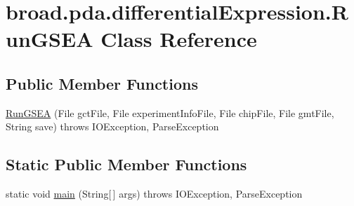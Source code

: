 \hypertarget{classbroad_1_1pda_1_1differential_expression_1_1_run_g_s_e_a}{\section{broad.\+pda.\+differential\+Expression.\+Run\+G\+S\+E\+A Class Reference}
\label{classbroad_1_1pda_1_1differential_expression_1_1_run_g_s_e_a}
}
\subsection*{Public Member Functions}
\begin{DoxyCompactItemize}
\item 
\hyperlink{classbroad_1_1pda_1_1differential_expression_1_1_run_g_s_e_a_a7a8ba3d2746bdbabcc8539b018f317b3}{Run\+G\+S\+E\+A} (File gct\+File, File experiment\+Info\+File, File chip\+File, File gmt\+File, String save)  throws I\+O\+Exception, Parse\+Exception
\end{DoxyCompactItemize}
\subsection*{Static Public Member Functions}
\begin{DoxyCompactItemize}
\item 
static void \hyperlink{classbroad_1_1pda_1_1differential_expression_1_1_run_g_s_e_a_a4001a06dc0523f7baec455f3a44719f8}{main} (String\mbox{[}$\,$\mbox{]} args)  throws I\+O\+Exception, Parse\+Exception
\end{DoxyCompactItemize}


